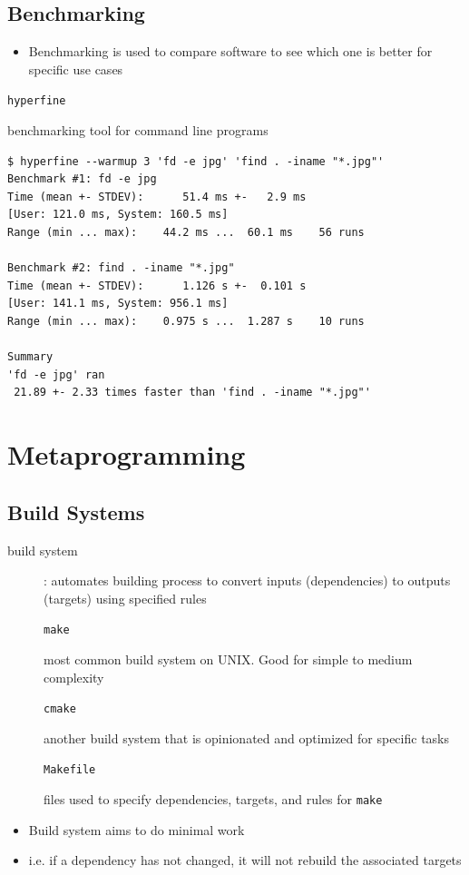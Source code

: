 \documentclass[letterpaper,12pt]{article}
\newcommand*{\lstitem}[1]{
  \setbox0\hbox{\lstinline{#1}}
  \item[\usebox0]
}
\begin{document}
\subsection{Benchmarking}
\begin{itemize}
 \item Benchmarking is used to compare software to see which one is better for specific use cases
\end{itemize}

\begin{description}
 \lstitem{hyperfine} benchmarking tool for command line programs
\end{description}

\begin{lstlisting}
$ hyperfine --warmup 3 'fd -e jpg' 'find . -iname "*.jpg"'
Benchmark #1: fd -e jpg
Time (mean +- STDEV):      51.4 ms +-   2.9 ms
[User: 121.0 ms, System: 160.5 ms]
Range (min ... max):    44.2 ms ...  60.1 ms    56 runs

Benchmark #2: find . -iname "*.jpg"
Time (mean +- STDEV):      1.126 s +-  0.101 s
[User: 141.1 ms, System: 956.1 ms]
Range (min ... max):    0.975 s ...  1.287 s    10 runs

Summary
'fd -e jpg' ran
 21.89 +- 2.33 times faster than 'find . -iname "*.jpg"'
\end{lstlisting}


\section{Metaprogramming}

\subsection{Build Systems}

\begin{description}
 \item[build system]: automates building process to convert inputs (dependencies) to outputs (targets) using specified rules
       \lstitem{make} most common build system on UNIX. Good for simple to medium complexity
       \lstitem{cmake} another build system that is opinionated and optimized for specific tasks
       \lstitem{Makefile} files used to specify dependencies, targets, and rules for \lstinline{make}
\end{description}

\begin{itemize}
 \item Build system aims to do minimal work
 \item i.e. if a dependency has not changed, it will not rebuild the associated targets
\end{itemize}
\end{document}
